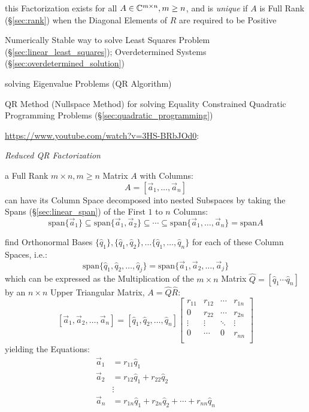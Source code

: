 this Factorization exists for all $A \in \mathbb{C}^{m \times n}, m \geq n$, and is
\emph{unique} if $A$ is Full Rank (\S\ref{sec:rank}) when the Diagonal Elements
of $R$ are required to be Positive

Numerically Stable way to solve Least Squares Problem
(\S\ref{sec:linear_least_squares}); Overdetermined Systems
(\S\ref{sec:overdetermined_solution})

solving Eigenvalue Problems (QR Algorithm)

\fist QR Method (Nullspace Method) for solving Equality Constrained Quadratic
Programming Problems (\S\ref{sec:quadratic_programming})


\url{https://www.youtube.com/watch?v=3HS-BRbJOd0}:

\emph{Reduced QR Factorization}

a Full Rank $m \times n, m \geq n$ Matrix $A$ with Columns:
\[
  A = [ \vec{a}_1, \ldots, \vec{a}_n ]
\]
can have its Column Space decomposed into nested Subspaces by taking the Spans
(\S\ref{sec:linear_span}) of the First $1$ to $n$ Columns:
\[
  \mathrm{span} \{ \vec{a}_1 \} \subseteq
  \mathrm{span} \{ \vec{a}_1, \vec{a}_2 \}
  \subseteq \cdots \subseteq
  \mathrm{span} \{ \vec{a}_1, \ldots, \vec{a}_n \}
  = \mathrm{span} A
\]

find Orthonormal Bases $\{ \hat{q}_1 \}, \{ \hat{q}_1, \hat{q}_2 \}, \ldots \{
\hat{q}_1, \ldots, \hat{q}_n\}$ for each of these Column Spaces, i.e.:
\[
  \mathrm{span} \{ \hat{q}_1, \hat{q}_2, \ldots, \hat{q}_j \} =
  \mathrm{span} \{ \vec{a}_1, \vec{a}_2, \ldots, \vec{a}_j \}
\]
which can be expressed as the Multiplication of the $m \times n$ Matrix
$\hat{Q} = [ \hat{q}_1 \cdots \hat{q}_n ]$ by an $n \times n$ Upper Triangular
Matrix, $A = \hat{Q}\hat{R}$:
\[
  [\vec{a}_1, \vec{a}_2, \ldots, \vec{a}_n] =
  [\hat{q}_1, \hat{q}_2, \ldots, \hat{q}_n]
  \begin{bmatrix}
    r_{11} & r_{12} & \cdots & r_{1n} \\
    0      & r_{22} & \cdots & r_{2n} \\
    \vdots & \vdots & \ddots & \vdots \\
    0      & \cdots & 0      & r_{nn} \\
  \end{bmatrix}
\]
yielding the Equations:
\begin{align*}
  \vec{a}_1 & = r_{11}\hat{q}_1 \\
  \vec{a}_2 & = r_{12}\hat{q}_1 + r_{22}\hat{q}_2 \\
            & \vdots \\
  \vec{a}_n & = r_{1n}\hat{q}_1 + r_{2n}\hat{q}_2 + \cdots + r_{nn}\hat{q}_n \\
\end{align*}

